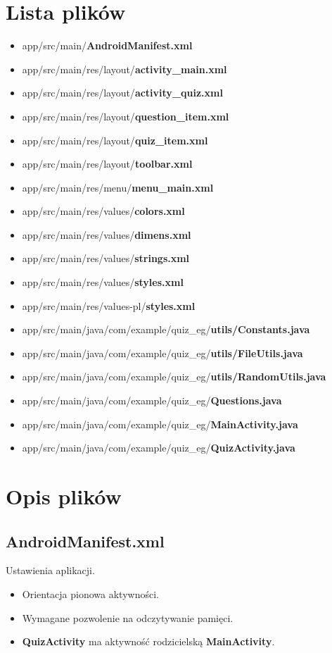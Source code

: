 \documentclass[12pt, a4paper]{article}
\begin{document}
\section{Lista plików}
\begin{itemize}
\item app/src/main/\textbf{AndroidManifest.xml}
\item app/src/main/res/layout/\textbf{activity\_main.xml}
\item app/src/main/res/layout/\textbf{activity\_quiz.xml}
\item app/src/main/res/layout/\textbf{question\_item.xml}
\item app/src/main/res/layout/\textbf{quiz\_item.xml}
\item app/src/main/res/layout/\textbf{toolbar.xml}
\item app/src/main/res/menu/\textbf{menu\_main.xml}
\item app/src/main/res/values/\textbf{colors.xml}
\item app/src/main/res/values/\textbf{dimens.xml}
\item app/src/main/res/values/\textbf{strings.xml}
\item app/src/main/res/values/\textbf{styles.xml}
\item app/src/main/res/values-pl/\textbf{styles.xml}
\item app/src/main/java/com/example/quiz\_eg/\textbf{utils/Constants.java}
\item app/src/main/java/com/example/quiz\_eg/\textbf{utils/FileUtils.java}
\item app/src/main/java/com/example/quiz\_eg/\textbf{utils/RandomUtils.java}
\item app/src/main/java/com/example/quiz\_eg/\textbf{Questions.java}
\item app/src/main/java/com/example/quiz\_eg/\textbf{MainActivity.java}
\item app/src/main/java/com/example/quiz\_eg/\textbf{QuizActivity.java}
\end{itemize}
\newpage

\section{Opis plików}

\subsection{AndroidManifest.xml}
Ustawienia aplikacji.\\
\begin{itemize}
\item Orientacja pionowa aktywności.
\item Wymagane pozwolenie na odczytywanie pamięci.
\item \textbf{QuizActivity} ma aktywność rodzicielską \textbf{MainActivity}.
\end{itemize}
\end{document}
